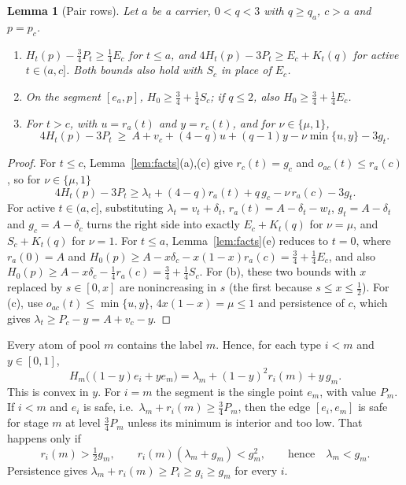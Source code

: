 \documentclass[11pt,a4paper]{article}
\numberwithin{equation}{section}
\newtheorem{lemma}[theorem]{Lemma}
\theoremstyle{definition}
\newcommand{\tq}{\tfrac34}
\begin{document}
\begin{lemma}[Pair rows]\label{lem:rows}Let $a$ be a carrier, $0<q<3$ with $q\ge q_a$, $c>a$ and $p=p_c$.
\begin{enumerate}[label=(\alph*)]
\item $H_t(p)-\tq P_t\ge\frac14E_c$ for $t\le a$, and
$4H_t(p)-3P_t\ge E_c+K_t(q)$ for active $t\in(a,c]$. Both bounds also hold
with $S_c$ in place of $E_c$.
\item On the segment $[e_a,p]$, $H_0\ge\frac34+\frac14S_c$; if $q\le2$, also
$H_0\ge\frac34+\frac14E_c$.
\item For $t>c$, with $u=r_a(t)$ and $y=r_c(t)$, and for $\nu\in\{\mu,1\}$,
\[
4H_t(p)-3P_t\ \ge\ A+v_c+(4-q)u+(q-1)y-\nu\min\{u,y\}-3g_t.
\]
\end{enumerate}
\end{lemma}

\begin{proof}
For $t\le c$, Lemma~\ref{lem:facts}(a),(c) give $r_c(t)=g_c$ and
$o_{ac}(t)\le r_a(c)$, so for $\nu\in\{\mu,1\}$
\[
4H_t(p)-3P_t\ge\lambda_t+(4-q)r_a(t)+q\,g_c-\nu\,r_a(c)-3g_t.
\]
For active $t\in(a,c]$, substituting $\lambda_t=v_t+\delta_t$,
$r_a(t)=A-\delta_t-w_t$, $g_t=A-\delta_t$ and $g_c=A-\delta_c$ turns the right
side into exactly $E_c+K_t(q)$ for $\nu=\mu$, and $S_c+K_t(q)$ for $\nu=1$. For
$t\le a$, Lemma~\ref{lem:facts}(e) reduces to $t=0$, where $r_a(0)=A$ and
$H_0(p)\ge A-x\delta_c-x(1-x)r_a(c)=\frac34+\frac14E_c$, and also
$H_0(p)\ge A-x\delta_c-\frac14r_a(c)=\frac34+\frac14S_c$. For (b), these two
bounds with $x$ replaced by $s\in[0,x]$ are nonincreasing in $s$ (the first
because $s\le x\le\frac12$). For (c), use $o_{ac}(t)\le\min\{u,y\}$,
$4x(1-x)=\mu\le1$ and persistence of $c$, which gives
$\lambda_t\ge P_c-y=A+v_c-y$.
\end{proof}

Every atom of pool $m$ contains the label $m$. Hence, for each type $i<m$ and
$y\in[0,1]$,
\begin{equation}\label{eq:terminal-edge}
H_m\bigl((1-y)e_i+ye_m\bigr)=\lambda_m+(1-y)^2r_i(m)+y\,g_m .
\end{equation}
This is convex in $y$. For $i=m$ the segment is the single point $e_m$, with
value $P_m$. If $i<m$ and $e_i$ is safe, i.e.\ $\lambda_m+r_i(m)\ge\tq P_m$, then
the edge $[e_i,e_m]$ is safe for stage $m$ at level $\frac34P_m$ unless its
minimum is interior and too low. That happens only if
\begin{equation}\label{eq:unsafe-edge}
r_i(m)>\tfrac12g_m,\qquad r_i(m)(\lambda_m+g_m)<g_m^2,\qquad\text{hence}\quad\lambda_m<g_m.
\end{equation}
Persistence gives $\lambda_m+r_i(m)\ge P_i\ge g_i\ge g_m$ for every $i$.
\end{document}

